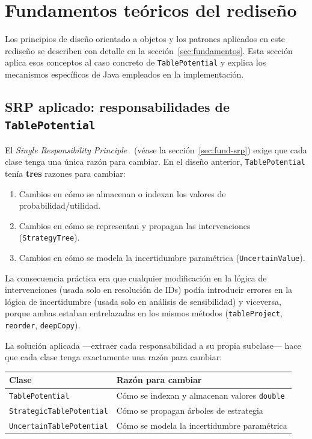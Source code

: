 \documentclass[11pt,a4paper]{article}
\newcommand{\code}[1]{\texttt{#1}}
\begin{document}
\section{Fundamentos teóricos del rediseño}
\label{sec:fundamentos-impl}

Los principios de diseño orientado a objetos y los patrones aplicados en este
rediseño se describen con detalle en la sección~\ref{sec:fundamentos}.  Esta
sección aplica esos conceptos al caso concreto de \code{TablePotential} y
explica los mecanismos específicos de Java empleados en la implementación.

\subsection{SRP aplicado: responsabilidades de \texttt{TablePotential}}

El \emph{Single Responsibility Principle}~\cite{martin2003}
(véase la sección~\ref{sec:fund-srp}) exige que cada clase tenga una única
razón para cambiar.  En el diseño anterior,
\code{TablePotential} tenía \textbf{tres} razones para cambiar:

\begin{enumerate}
  \item Cambios en cómo se almacenan o indexan los valores de probabilidad/utilidad.
  \item Cambios en cómo se representan y propagan las intervenciones
        (\code{StrategyTree}).
  \item Cambios en cómo se modela la incertidumbre paramétrica
        (\code{UncertainValue}).
\end{enumerate}

La consecuencia práctica era que cualquier modificación en la lógica de
intervenciones (usada solo en resolución de IDs) podía introducir errores en la
lógica de incertidumbre (usada solo en análisis de sensibilidad) y viceversa,
porque ambas estaban entrelazadas en los mismos métodos (\code{tableProject},
\code{reorder}, \code{deepCopy}).

La solución aplicada ---extraer cada responsabilidad a su propia subclase--- hace
que cada clase tenga exactamente una razón para cambiar:

\begin{center}
\begin{tabular}{ll}
\toprule
\textbf{Clase} & \textbf{Razón para cambiar} \\
\midrule
\code{TablePotential} & Cómo se indexan y almacenan valores \code{double} \\
\code{StrategicTablePotential} & Cómo se propagan árboles de estrategia \\
\code{UncertainTablePotential} & Cómo se modela la incertidumbre paramétrica \\
\bottomrule
\end{tabular}
\end{center}
\end{document}
